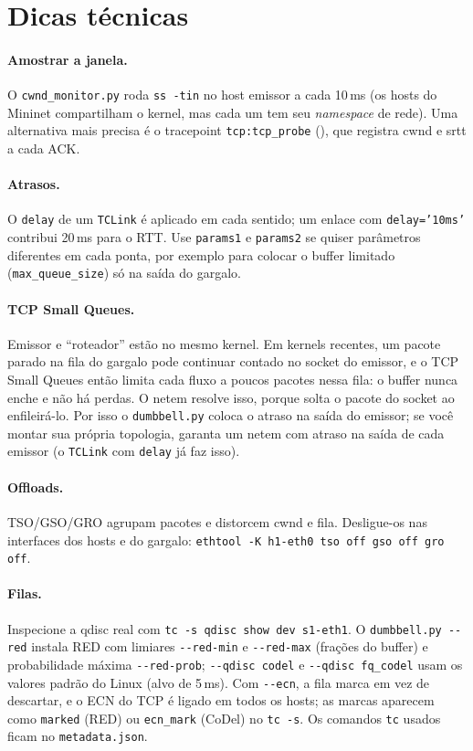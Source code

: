 \documentclass[11pt,a4paper]{article}
\begin{document}
\section{Dicas técnicas}
\label{app:dicas}

\paragraph{Amostrar a janela.} O \texttt{cwnd\_monitor.py} roda \texttt{ss -tin} no host
emissor a cada 10\,ms (os hosts do Mininet compartilham o kernel, mas cada um tem seu
\emph{namespace} de rede). Uma alternativa mais precisa é o tracepoint
\texttt{tcp:tcp\_probe} (), que
registra cwnd e srtt a cada ACK.

\paragraph{Atrasos.} O \texttt{delay} de um \texttt{TCLink} é aplicado em cada sentido;
um enlace com \texttt{delay='10ms'} contribui 20\,ms para o RTT. Use \texttt{params1} e
\texttt{params2} se quiser parâmetros diferentes em cada ponta, por exemplo para colocar
o buffer limitado (\texttt{max\_queue\_size}) só na saída do gargalo.

\paragraph{TCP Small Queues.} Emissor e “roteador” estão no mesmo kernel. Em kernels
recentes, um pacote parado na fila do gargalo pode continuar contado no socket do
emissor, e o TCP Small Queues então limita cada fluxo a poucos pacotes nessa fila: o
buffer nunca enche e não há perdas. O netem resolve isso, porque solta o pacote do
socket ao enfileirá-lo. Por isso o \texttt{dumbbell.py} coloca o atraso na saída do
emissor; se você montar sua própria topologia, garanta um netem com atraso na saída de
cada emissor (o \texttt{TCLink} com \texttt{delay} já faz isso).

\paragraph{Offloads.} TSO/GSO/GRO agrupam pacotes e distorcem cwnd e fila. Desligue-os
nas interfaces dos hosts e do gargalo:
\texttt{ethtool -K h1-eth0 tso off gso off gro off}.

\paragraph{Filas.} Inspecione a qdisc real com \texttt{tc -s qdisc show dev s1-eth1}.
O \texttt{dumbbell.py -{}-red} instala RED com limiares \texttt{-{}-red-min} e
\texttt{-{}-red-max} (frações do buffer) e probabilidade máxima \texttt{-{}-red-prob};
\texttt{-{}-qdisc codel} e \texttt{-{}-qdisc fq\_codel} usam os valores padrão do Linux
(alvo de 5\,ms). Com \texttt{-{}-ecn}, a fila marca em vez de descartar, e o ECN do TCP é
ligado em todos os hosts; as marcas aparecem como \texttt{marked} (RED) ou
\texttt{ecn\_mark} (CoDel) no \texttt{tc -s}. Os comandos \texttt{tc} usados ficam no
\texttt{metadata.json}.
\end{document}

